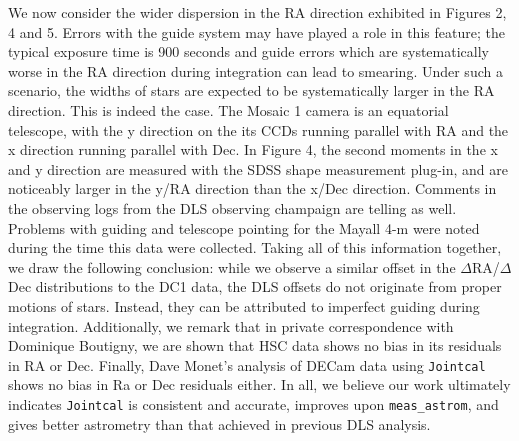 \documentclass[DM,toc]{lsstdoc}
\begin{document}
We now consider the wider dispersion in the RA direction exhibited in Figures 2, 4 and 5. Errors with the guide system may have played a role in this feature; the typical exposure time is 900 seconds and guide errors which are systematically worse in the RA direction during integration can lead to smearing. Under such a scenario, the widths of stars are expected to be systematically larger in the RA direction.
This is indeed the case. The Mosaic 1 camera is an equatorial telescope, with the y direction on the its CCDs running parallel with RA and the x direction running parallel with Dec. In Figure 4, the second moments in the x and y direction are measured with the SDSS shape measurement plug-in, and are noticeably larger in the y/RA direction than the x/Dec direction.
Comments in the observing logs from the DLS observing champaign are telling as well. Problems with guiding and telescope pointing for the Mayall 4-m were noted during the time this data were collected. Taking all of this information together, we draw the following conclusion: while we observe a similar offset in the $\Delta$RA/$\Delta$Dec distributions to the DC1 data, the DLS offsets do not originate from proper motions of stars. Instead, they can be attributed to imperfect guiding during integration. Additionally, we remark that in private correspondence with Dominique Boutigny, we are shown that HSC data shows no bias in its residuals in RA or Dec. Finally, Dave Monet's analysis of DECam data using {\tt\string Jointcal} shows no bias in Ra or Dec residuals either.
In all, we believe our work ultimately indicates {\tt\string Jointcal} is consistent and accurate, improves upon {\tt\string meas\_astrom}, and gives better astrometry than that achieved in previous DLS analysis.
\end{document}
